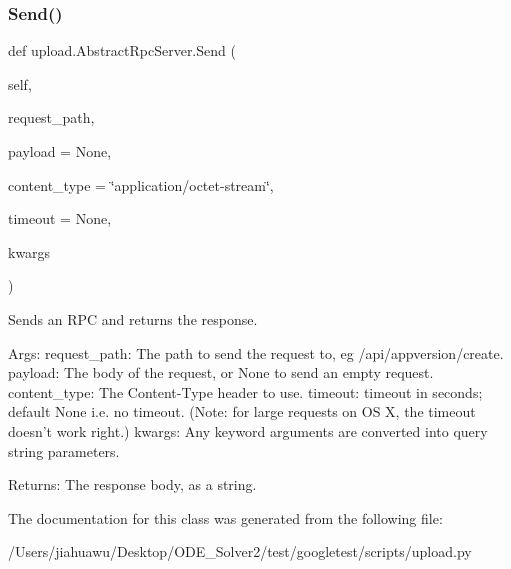 \subsubsection{\texorpdfstring{Send()}{Send()}}
{\footnotesize\ttfamily def upload.\+Abstract\+Rpc\+Server.\+Send (\begin{DoxyParamCaption}\item[{}]{self,  }\item[{}]{request\+\_\+path,  }\item[{}]{payload = {\ttfamily None},  }\item[{}]{content\+\_\+type = {\ttfamily \char`\"{}application/octet-\/stream\char`\"{}},  }\item[{}]{timeout = {\ttfamily None},  }\item[{}]{kwargs }\end{DoxyParamCaption})}

\begin{DoxyVerb}Sends an RPC and returns the response.

Args:
  request_path: The path to send the request to, eg /api/appversion/create.
  payload: The body of the request, or None to send an empty request.
  content_type: The Content-Type header to use.
  timeout: timeout in seconds; default None i.e. no timeout.
(Note: for large requests on OS X, the timeout doesn't work right.)
  kwargs: Any keyword arguments are converted into query string parameters.

Returns:
  The response body, as a string.
\end{DoxyVerb}
 

The documentation for this class was generated from the following file\+:\begin{DoxyCompactItemize}
\item 
/\+Users/jiahuawu/\+Desktop/\+O\+D\+E\+\_\+\+Solver2/test/googletest/scripts/upload.\+py\end{DoxyCompactItemize}
